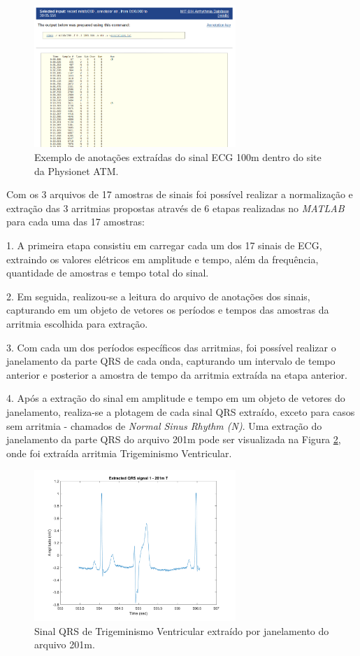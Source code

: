 \documentclass[conference]{IEEEtran}
\begin{document}
\begin{figure}[!h]
	\centering
	\includegraphics[width=3in]{img/ecgSignalAnnotationsExample}
	\caption{Exemplo de anotações extraídas do sinal ECG 100m dentro do site da Physionet ATM.}
	\label{ecgSignalAnnotationsExample}
\end{figure}

Com os 3 arquivos de 17 amostras de sinais foi possível realizar a normalização e extração das 3 arritmias propostas através de 6 etapas realizadas no \textit{MATLAB} para cada uma das 17 amostras:

1. A primeira etapa consistiu em carregar cada um dos 17 sinais de ECG, extraindo os valores elétricos em amplitude e tempo, além da frequência, quantidade de amostras e tempo total do sinal.

2. Em seguida, realizou-se a leitura do arquivo de anotações dos sinais, capturando em um objeto de vetores os períodos e tempos das amostras da arritmia escolhida para extração.

3. Com cada um dos períodos específicos das arritmias, foi possível realizar o janelamento da parte QRS de cada onda, capturando um intervalo de tempo anterior e posterior a amostra de tempo da arritmia extraída na etapa anterior. 

4. Após a extração do sinal em amplitude e tempo em um objeto de vetores do janelamento, realiza-se a plotagem de cada sinal QRS extraído, exceto para casos sem arritmia - chamados de \textit{Normal Sinus Rhythm (N)}. Uma extração do janelamento da parte QRS do arquivo 201m pode ser visualizada na Figura \ref{signalQRSExtractedTrigeminy}, onde foi extraída arritmia Trigeminismo Ventricular.

\begin{figure}[!h]
	\centering
	\includegraphics[width=3in]{img/signalQRSExtractedTrigeminy}
	\caption{Sinal QRS de Trigeminismo Ventricular extraído por janelamento do arquivo 201m.}
	\label{signalQRSExtractedTrigeminy}
\end{figure}
\end{document}
